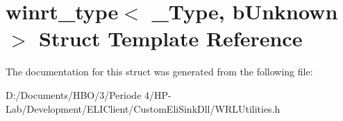 \hypertarget{structwinrt__type}{}\section{winrt\+\_\+type$<$ \+\_\+\+Type, b\+Unknown $>$ Struct Template Reference}
\label{structwinrt__type}


The documentation for this struct was generated from the following file\+:\begin{DoxyCompactItemize}
\item 
D\+:/\+Documents/\+H\+B\+O/3/\+Periode 4/\+H\+P-\/\+Lab/\+Development/\+E\+L\+I\+Client/\+Custom\+Eli\+Sink\+Dll/W\+R\+L\+Utilities.\+h\end{DoxyCompactItemize}
